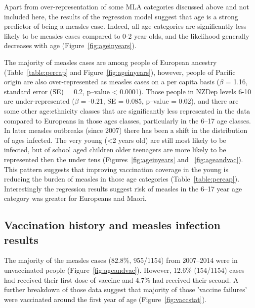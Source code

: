 \documentclass{article}
\begin{document}
\begin{itemize}
\par Apart from over-representation of some MLA categories discussed above and not included here, the results of the regression model suggest that age is a strong predictor of being a measles case. Indeed, all age categories are significantly less likely to be measles cases compared to 0-2 year olds, and the likelihood generally decreases with age (Figure~\ref{fig:ageinyears}).

The majority of measles cases are among people of European ancestry (Table~\ref{table:percap} and Figure~\ref{fig:ageinyears}), however, people of Pacific origin are also over-represented as measles cases on a per capita basis ($\beta$ = 1.16, standard error (SE) = 0.2, p--value < 0.0001). Those people in NZDep levels 6-10 are under-represented ($\beta$ = -0.21, SE = 0.085, p--value = 0.02), and there are some other age:ethnicity classes that are significantly less represented in the data compared to Europeans in those ages classes, particularly in the 6--17 age classes. In later measles outbreaks (since 2007) there has been a shift in the distribution of ages infected. The very young (<2 years old) are still most likely to be infected, but of school aged children older teenagers are more likely to be represented then the under tens (Figures~\ref{fig:ageinyears} and ~\ref{fig:ageandvac}). This pattern suggests that improving vaccination coverage in the young is reducing the burden of measles in those age categories (Table~\ref{table:percap}). Interestingly the regression results suggest risk of measles in the 6--17 year age category was greater for Europeans and Maori.

\subsection{Vaccination history and measles infection results}

The majority of the measles cases (82.8\%, 955/1154) from 2007--2014 were in unvaccinated people (Figure~\ref{fig:ageandvac}). However, 12.6\% (154/1154) cases had received their first dose of vaccine and 4.7\% had received their second. A further breakdown of those data suggest that majority of those 'vaccine failures' were vaccinated around the first year of age (Figure~\ref{fig:vaccstat}).


\end{itemize}
\end{document}
